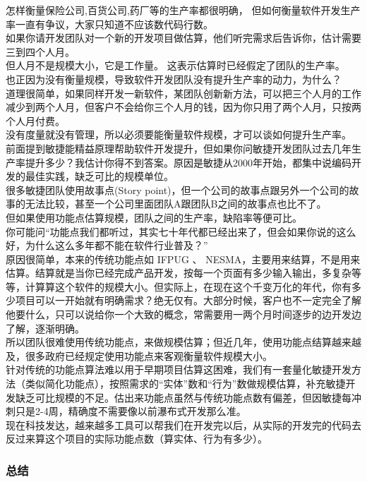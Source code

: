 怎样衡量保险公司,百货公司,药厂等的生产率都很明确，
但如何衡量软件开发生产率一直有争议，大家只知道不应该数代码行数。\\
如果你请开发团队对一个新的开发项目做估算，他们听完需求后告诉你，估计需要三到四个人月。\\
但人月不是规模大小，它是工作量。 这表示估算时已经假定了团队的生产率。\\
也正因为没有衡量规模，导致软件开发团队没有提升生产率的动力，为什么？\\
道理很简单，如果同样开发一新软件，某团队创新新方法，可以把三个人月的工作减少到两个人月，但客户不会给你三个人月的钱，因为你只用了两个人月，只按两个人月付费。\\
没有度量就没有管理，所以必须要能衡量软件规模，才可以谈如何提升生产率。\\
前面提到敏捷能精益原理帮助软件开发提升，但如果你问敏捷开发团队过去几年生产率提升多少？我估计你得不到答案。原因是敏捷从2000年开始，都集中说编码开发的最佳实践，缺乏可比的规模单位。\\
很多敏捷团队使用故事点(Story
point)，但一个公司的故事点跟另外一个公司的故事的无法比较，甚至一个公司里面团队A跟团队B之间的故事点也比不了。\\
但如果使用功能点估算规模，团队之间的生产率，缺陷率等便可比。\\
你可能问``功能点我们都听过，其实七十年代都已经出来了，但会如果你说的这么好，为什么这么多年都不能在软件行业普及？''\\
原因很简单，本来的传统功能点如 IFPUG 、
NESMA，主要用来结算，不是用来估算。结算就是当你已经完成产品开发，按每一个页面有多少输入输出，多复杂等等，计算算这个软件的规模大小。但实际上，在现在这个千变万化的年代，你有多少项目可以一开始就有明确需求？绝无仅有。大部分时候，客户也不一定完全了解他要什么，只可以说给你一个大致的概念，常需要用一两个月时间逐步的边开发边了解，逐渐明确。\\
所以团队很难使用传统功能点，来做规模估算；但近几年，使用功能点结算越来越及，很多政府已经规定使用功能点来客观衡量软件规模大小。\\
针对传统的功能点算法难以用于早期项目估算这困难，我们有一套量化敏捷开发方法（类似简化功能点），按照需求的``实体''数和``行为''数做规模估算，补充敏捷开发缺乏可比规模的不足。估出来功能点虽然与传统功能点数有偏差，但因敏捷每冲刺只是2-4周，精确度不需要像以前瀑布式开发那么准。\\
现在科技发达，越来越多工具可以帮我们在开发完以后，从实际的开发完的代码去反过来算这个项目的实际功能点数（算实体、行为有多少）。\\

\hypertarget{ux603bux7ed3}{%
\subsubsection{总结}\label{ux603bux7ed3}}

